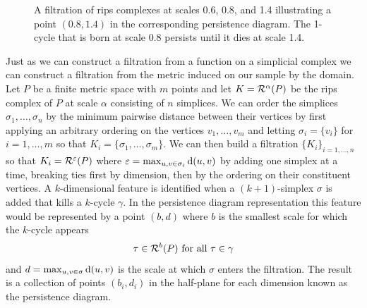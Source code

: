 \begin{figure}[htbp]
    \caption{A filtration of rips complexes at scales 0.6, 0.8, and 1.4 illustrating a point $(0.8, 1.4)$ in the corresponding persistence diagram. The 1-cycle that is born at scale 0.8 persists until it dies at scale 1.4.}
    \label{fig:persist}
\end{figure}



Just as we can construct a filtration from a function on a simplicial complex we can construct a filtration from the metric induced on our sample by the domain.
Let $P$ be a finite metric space with $m$ points and let $K = \mathcal{R}^\alpha(P)$ be the rips complex of $P$ at scale $\alpha$ consisting of $n$ simplices.
We can order the simplices $\sigma_1,\ldots,\sigma_n$ by the minimum pairwise distance between their vertices by first applying an arbitrary ordering on the vertices $v_1,\ldots,v_m$ and letting $\sigma_i = \{v_i\}$ for $i=1,\ldots,m$ so that $K_i = \{\sigma_1,\ldots, \sigma_m\}$.
We can then build a filtration $\{K_i\}_{i=1,\ldots,n}$ so that $K_i = \mathcal{R}^\varepsilon(P)$ where $\varepsilon = \max_{u,v\in\sigma_i}\mathrm{d}(u,v)$ by adding one simplex at a time, breaking ties first by dimension, then by the ordering on their constituent vertices.
A $k$-dimensional feature is identified when a $(k+1)$-simplex $\sigma$ is added that kills a $k$-cycle $\gamma$.
In the persistence diagram representation this feature would be represented by a point $(b, d)$ where $b$ is the smallest scale for which the $k$-cycle appears
\[ \tau\in\mathcal{R}^b(P)\text{ for all }\tau\in\gamma\]
and $d = \max_{u,v\in\sigma}\mathrm{d}(u,v)$ is the scale at which $\sigma$ enters the filtration.
The result is a collection of points $(b_i, d_i)$ in the half-plane for each dimension known as the persistence diagram.


